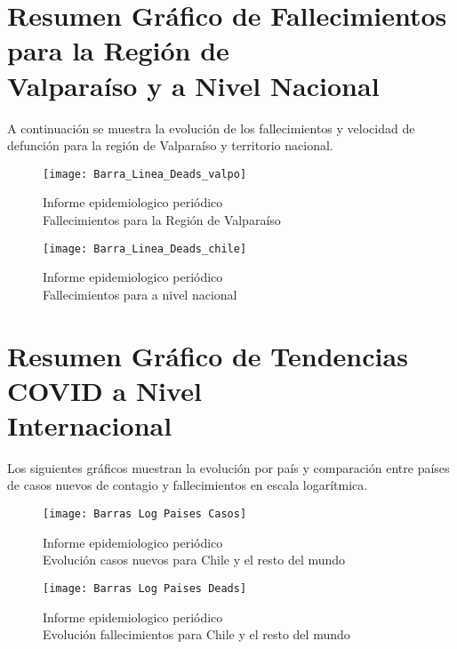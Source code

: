 \documentclass{article}
\begin{document}
\hfill \break
\hfill \break
\hfill \break
\hfill \break
\hfill \break
\hfill \break
\hfill \break
\hfill \break
\hfill \break
\hfill \break
\hfill \break

\section{Resumen Gráfico de Fallecimientos para la Región de \\ Valparaíso y a Nivel Nacional}

A continuación se muestra la evolución de los fallecimientos y velocidad de defunción para la región de Valparaíso y territorio nacional.

\begin{figure}[H]
	\texttt{[image: Barra\_Linea\_Deads\_valpo]}
	\centering
	\caption{Informe epidemiologico periódico \\ Fallecimientos para la Región de Valparaíso}
\end{figure}

\begin{figure}[H]
	\texttt{[image: Barra\_Linea\_Deads\_chile]}
	\centering
	\caption{Informe epidemiologico periódico \\ Fallecimientos para a nivel nacional}
\end{figure}

\hfill \break
\hfill \break
\hfill \break
\hfill \break
\hfill \break
\hfill \break
\hfill \break
\hfill \break
\hfill \break
\hfill \break
\hfill \break

\section{Resumen Gráfico de Tendencias COVID a Nivel \\ Internacional}

Los siguientes gráficos muestran la evolución por país y comparación entre países de casos nuevos de contagio y fallecimientos en escala logarítmica.

\begin{figure}[H]
	\texttt{[image: Barras Log Paises Casos]}
	\centering
	\caption{Informe epidemiologico periódico \\ Evolución casos nuevos para Chile y el resto del mundo}

\end{figure}

\begin{figure}[H]
	\texttt{[image: Barras Log Paises Deads]}
	\centering
	\caption{Informe epidemiologico periódico \\ Evolución fallecimientos para Chile y el resto del mundo}

\end{figure}
\end{document}
